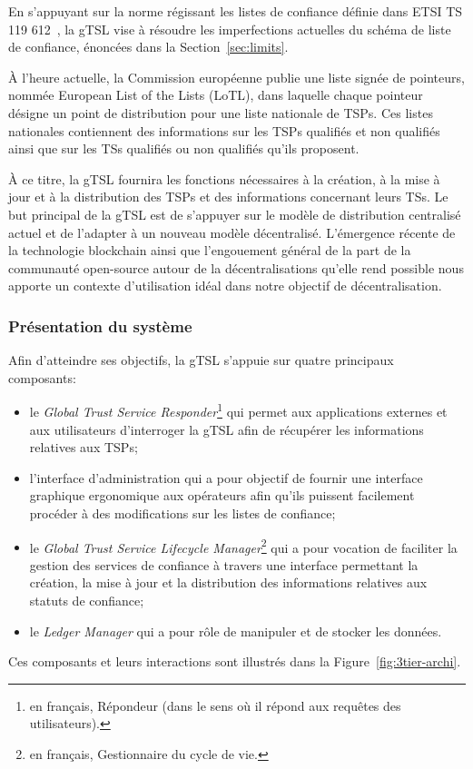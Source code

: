 \documentclass{tnreport}
\begin{document}
En s'appuyant sur la norme régissant les listes de confiance définie dans ETSI TS 119 612~\cite{ETSITS119612}, la gTSL vise à résoudre les imperfections actuelles du schéma de liste de confiance, énoncées dans la Section~\ref{sec:limits}. 

À l'heure actuelle, la Commission européenne publie une liste signée de pointeurs, nommée European List of the Lists (LoTL), dans laquelle chaque pointeur désigne un point de distribution pour une liste nationale de TSPs. 
Ces listes nationales contiennent des informations sur les TSPs qualifiés et non qualifiés ainsi que sur les TSs qualifiés ou non qualifiés qu'ils proposent.

À ce titre, la gTSL fournira les fonctions nécessaires à la création, à la mise à jour et à la distribution des TSPs et des informations concernant leurs TSs.
Le but principal de la gTSL est de s'appuyer sur le modèle de distribution centralisé actuel et de l'adapter à un nouveau modèle décentralisé.
L'émergence récente de la technologie blockchain ainsi que l'engouement général de la part de la communauté open-source autour de la décentralisations qu'elle rend possible nous apporte un contexte d'utilisation idéal dans notre objectif de décentralisation.

\subsubsection{Présentation du système}

Afin d'atteindre ses objectifs, la gTSL s'appuie sur quatre principaux composants:
\begin{itemize}	
	\item le \textit{Global Trust Service Responder}\footnote{en français, Répondeur (dans le sens où il répond aux requêtes des utilisateurs).} qui permet aux applications externes et aux utilisateurs d'interroger la gTSL afin de récupérer les informations relatives aux TSPs;
	\item l'interface d'administration qui a pour objectif de fournir une interface graphique ergonomique aux opérateurs afin qu'ils puissent facilement procéder à des modifications sur les listes de confiance;
	\item le \textit{Global Trust Service Lifecycle Manager}\footnote{en français, Gestionnaire du cycle de vie.} qui a pour vocation de faciliter la gestion des services de confiance à travers une interface permettant la création, la mise à jour et la distribution des informations relatives aux statuts de confiance;
	\item le \textit{Ledger Manager} qui a pour rôle de manipuler et de stocker les données.
	\newline
\end{itemize}
Ces composants et leurs interactions sont illustrés dans la Figure~\ref{fig:3tier-archi}.
\end{document}
